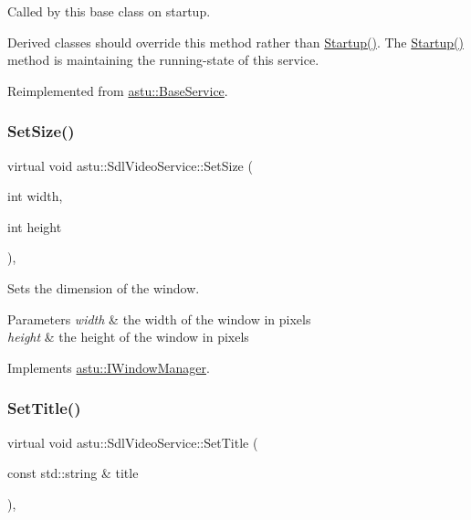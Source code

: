 Called by this base class on startup.

Derived classes should override this method rather than {\ttfamily \hyperlink{classastu_1_1BaseService_a59dade033dcb44dd32155c526a3a58e2}{Startup()}}. The {\ttfamily \hyperlink{classastu_1_1BaseService_a59dade033dcb44dd32155c526a3a58e2}{Startup()}} method is maintaining the running-\/state of this service. 

Reimplemented from \hyperlink{classastu_1_1BaseService_ac8710cd2d6dcc990db65e7c8ccfbc5ff}{astu\+::\+Base\+Service}.

\mbox{\label{classastu_1_1SdlVideoService_a1c8d729ef42024bc0cc5065ecc6631c8}} 
\subsubsection{\texorpdfstring{Set\+Size()}{SetSize()}}
{\footnotesize\ttfamily virtual void astu\+::\+Sdl\+Video\+Service\+::\+Set\+Size (\begin{DoxyParamCaption}\item[{int}]{width,  }\item[{int}]{height }\end{DoxyParamCaption})\hspace{0.3cm}{\ttfamily [override]}, {\ttfamily [virtual]}}

Sets the dimension of the window.


\begin{DoxyParams}{Parameters}
{\em width} & the width of the window in pixels \\
\hline
{\em height} & the height of the window in pixels \\
\hline
\end{DoxyParams}


Implements \hyperlink{classastu_1_1IWindowManager_aca77eeecb7c790fa3c1d58c20dd7294f}{astu\+::\+I\+Window\+Manager}.

\mbox{\label{classastu_1_1SdlVideoService_aad3c873db481dd622d6ddcea70b279af}} 
\subsubsection{\texorpdfstring{Set\+Title()}{SetTitle()}}
{\footnotesize\ttfamily virtual void astu\+::\+Sdl\+Video\+Service\+::\+Set\+Title (\begin{DoxyParamCaption}\item[{const std\+::string \&}]{title }\end{DoxyParamCaption})\hspace{0.3cm}{\ttfamily [override]}, {\ttfamily [virtual]}}

